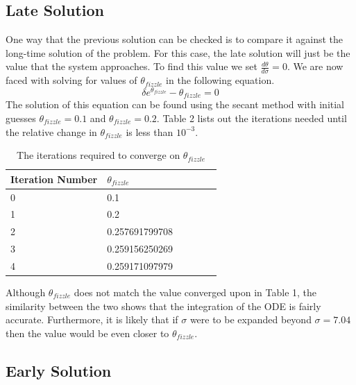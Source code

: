 \documentclass[12pt]{article}\pagestyle{myheadings}
\theoremstyle{plain}
\begin{document}
\subsection{Late Solution}
One way that the previous solution can be checked is to compare it against the long-time solution of the problem. For this case, the late solution will just be the value that the system approaches. To find this value we set $\frac{d\theta}{d\sigma} = 0$. We are now faced with solving for values of $\theta_{fizzle}$ in the following equation.
\[\delta e^{\theta_{fizzle}} - \theta_{fizzle} = 0\]
The solution of this equation can be found using the secant method with initial guesses $\theta_{fizzle} = 0.1$ and $\theta_{fizzle} = 0.2$. Table 2 lists out the iterations needed until the relative change in $\theta_{fizzle}$ is less than $10^{-3}$.

\begin{table}[ht!]
\centering
\begin{tabular} {| l | l | l | l | l | l |}
\hline
Iteration Number & $\theta_{fizzle}$ \\
\hline
0 & 0.1 \\
1 & 0.2 \\
2 & 0.257691799708 \\
3 & 0.259156250269 \\
4 & 0.259171097979 \\
\hline
\end{tabular}
\caption{The iterations required to converge on $\theta_{fizzle}$}
\end{table}

Although $\theta_{fizzle}$ does not match the value converged upon in Table 1, the similarity between the two shows that the integration of the ODE is fairly accurate. Furthermore, it is likely that if $\sigma$ were to be expanded beyond $\sigma = 7.04$ then the value would be even closer to $\theta_{fizzle}$. 

\subsection{Early Solution}
\end{document}
